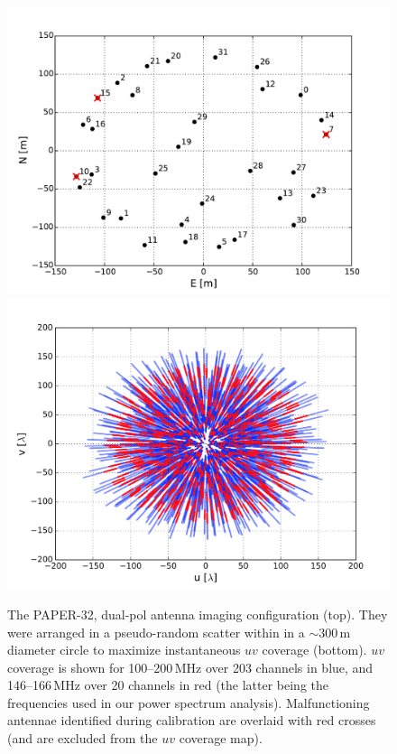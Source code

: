 \begin{figure}[h!]
\centering
\includegraphics[width=0.9\columnwidth]{chapters/eor_window_PAPER/figures/new_antenna_config.pdf}
\includegraphics[width=0.9\columnwidth]{chapters/eor_window_PAPER/figures/uv_coverage_exclbad_overlaid-compressed.png}
\caption[The PAPER-32, dual-pol antenna imaging configuration and \textit{uv} distribution.]{The PAPER-32, dual-pol antenna imaging configuration (top). They were arranged in a pseudo-random scatter within in a $\sim$300\,m diameter circle to maximize instantaneous $uv$ coverage (bottom). $uv$ coverage is shown for 100--200\,MHz over 203 channels in blue, and 146--166\,MHz over 20 channels in red (the latter being the frequencies used in our power spectrum analysis). Malfunctioning antennae identified during calibration are overlaid with red crosses (and are excluded from the $uv$ coverage map).\\}
\label{fig:psa32img_config}
\end{figure}

